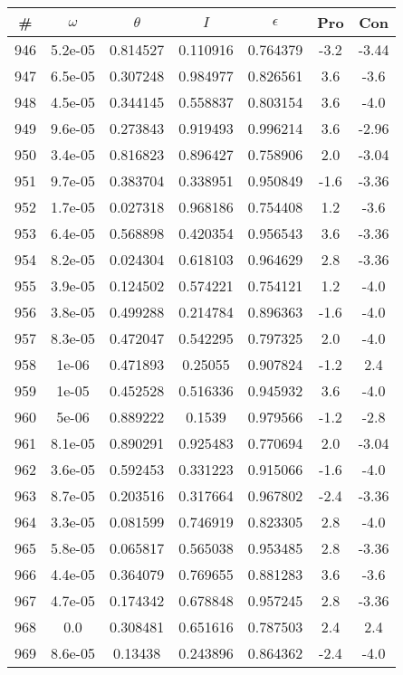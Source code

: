 \begin{table}
\begin{tabular}{c|c|c|c|c|c|c}
\# & $\omega$ & $\theta$ & $I$ & $\epsilon$ & Pro & Con\\
\hline
946 & 5.2e-05 & 0.814527 & 0.110916 & 0.764379 & -3.2 & -3.44\\
947 & 6.5e-05 & 0.307248 & 0.984977 & 0.826561 & 3.6 & -3.6\\
948 & 4.5e-05 & 0.344145 & 0.558837 & 0.803154 & 3.6 & -4.0\\
949 & 9.6e-05 & 0.273843 & 0.919493 & 0.996214 & 3.6 & -2.96\\
950 & 3.4e-05 & 0.816823 & 0.896427 & 0.758906 & 2.0 & -3.04\\
951 & 9.7e-05 & 0.383704 & 0.338951 & 0.950849 & -1.6 & -3.36\\
952 & 1.7e-05 & 0.027318 & 0.968186 & 0.754408 & 1.2 & -3.6\\
953 & 6.4e-05 & 0.568898 & 0.420354 & 0.956543 & 3.6 & -3.36\\
954 & 8.2e-05 & 0.024304 & 0.618103 & 0.964629 & 2.8 & -3.36\\
955 & 3.9e-05 & 0.124502 & 0.574221 & 0.754121 & 1.2 & -4.0\\
956 & 3.8e-05 & 0.499288 & 0.214784 & 0.896363 & -1.6 & -4.0\\
957 & 8.3e-05 & 0.472047 & 0.542295 & 0.797325 & 2.0 & -4.0\\
958 & 1e-06 & 0.471893 & 0.25055 & 0.907824 & -1.2 & 2.4\\
959 & 1e-05 & 0.452528 & 0.516336 & 0.945932 & 3.6 & -4.0\\
960 & 5e-06 & 0.889222 & 0.1539 & 0.979566 & -1.2 & -2.8\\
961 & 8.1e-05 & 0.890291 & 0.925483 & 0.770694 & 2.0 & -3.04\\
962 & 3.6e-05 & 0.592453 & 0.331223 & 0.915066 & -1.6 & -4.0\\
963 & 8.7e-05 & 0.203516 & 0.317664 & 0.967802 & -2.4 & -3.36\\
964 & 3.3e-05 & 0.081599 & 0.746919 & 0.823305 & 2.8 & -4.0\\
965 & 5.8e-05 & 0.065817 & 0.565038 & 0.953485 & 2.8 & -3.36\\
966 & 4.4e-05 & 0.364079 & 0.769655 & 0.881283 & 3.6 & -3.6\\
967 & 4.7e-05 & 0.174342 & 0.678848 & 0.957245 & 2.8 & -3.36\\
968 & 0.0 & 0.308481 & 0.651616 & 0.787503 & 2.4 & 2.4\\
969 & 8.6e-05 & 0.13438 & 0.243896 & 0.864362 & -2.4 & -4.0\\

\end{tabular}
\end{table}

